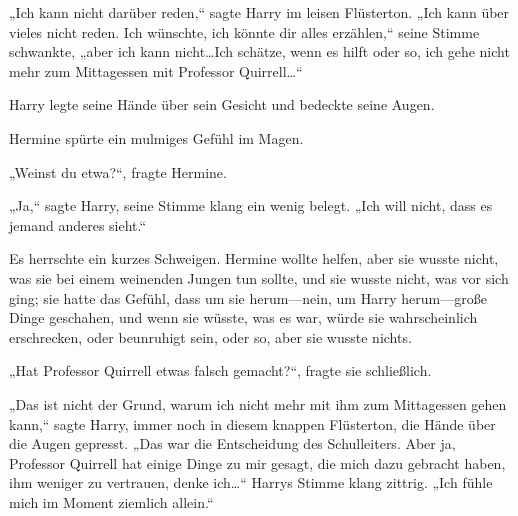 „Ich kann nicht darüber reden,“ sagte Harry im leisen Flüsterton. „Ich kann über vieles nicht reden. Ich wünschte, ich könnte dir alles erzählen,“ seine Stimme schwankte, „aber ich kann nicht…Ich schätze, wenn es hilft oder so, ich gehe nicht mehr zum Mittagessen mit Professor Quirrell…“

Harry legte seine Hände über sein Gesicht und bedeckte seine Augen.

Hermine spürte ein mulmiges Gefühl im Magen.

„Weinst du etwa?“, fragte Hermine.

„Ja,“ sagte Harry, seine Stimme klang ein wenig belegt. „Ich will nicht, dass es jemand anderes sieht.“

Es herrschte ein kurzes Schweigen. Hermine wollte helfen, aber sie wusste nicht, was sie bei einem weinenden Jungen tun sollte, und sie wusste nicht, was vor sich ging; sie hatte das Gefühl, dass um sie herum—nein, um Harry herum—große Dinge geschahen, und wenn sie wüsste, was es war, würde sie wahrscheinlich erschrecken, oder beunruhigt sein, oder so, aber sie wusste nichts.

„Hat Professor Quirrell etwas falsch gemacht?“, fragte sie schließlich.

„Das ist nicht der Grund, warum ich nicht mehr mit ihm zum Mittagessen gehen kann,“ sagte Harry, immer noch in diesem knappen Flüsterton, die Hände über die Augen gepresst. „Das war die Entscheidung des Schulleiters. Aber ja, Professor Quirrell hat einige Dinge zu mir gesagt, die mich dazu gebracht haben, ihm weniger zu vertrauen, denke ich…“ Harrys Stimme klang zittrig. „Ich fühle mich im Moment ziemlich allein.“

